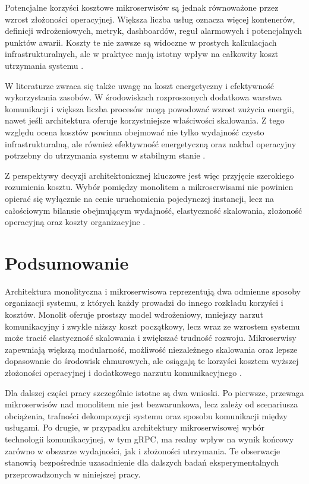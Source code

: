 Potencjalne korzyści kosztowe mikroserwisów są jednak równoważone przez wzrost złożoności operacyjnej. Większa liczba usług oznacza więcej kontenerów, definicji wdrożeniowych, metryk, dashboardów, reguł alarmowych i potencjalnych punktów awarii. Koszty te nie zawsze są widoczne w prostych kalkulacjach infrastrukturalnych, ale w praktyce mają istotny wpływ na całkowity koszt utrzymania systemu \cite{papakonstantinou2020technoeconomic}.

W literaturze zwraca się także uwagę na koszt energetyczny i efektywność wykorzystania zasobów. W środowiskach rozproszonych dodatkowa warstwa komunikacji i większa liczba procesów mogą powodować wzrost zużycia energii, nawet jeśli architektura oferuje korzystniejsze właściwości skalowania. Z tego względu ocena kosztów powinna obejmować nie tylko wydajność czysto infrastrukturalną, ale również efektywność energetyczną oraz nakład operacyjny potrzebny do utrzymania systemu w stabilnym stanie \cite{fontanadenardin2021energy}.

Z perspektywy decyzji architektonicznej kluczowe jest więc przyjęcie szerokiego rozumienia kosztu. Wybór pomiędzy monolitem a mikroserwisami nie powinien opierać się wyłącznie na cenie uruchomienia pojedynczej instancji, lecz na całościowym bilansie obejmującym wydajność, elastyczność skalowania, złożoność operacyjną oraz koszty organizacyjne \cite{villamizar2017cost}.

\section{Podsumowanie}
\label{sec:chapter2-summary}

Architektura monolityczna i mikroserwisowa reprezentują dwa odmienne sposoby organizacji systemu, z których każdy prowadzi do innego rozkładu korzyści i kosztów. Monolit oferuje prostszy model wdrożeniowy, mniejszy narzut komunikacyjny i zwykle niższy koszt początkowy, lecz wraz ze wzrostem systemu może tracić elastyczność skalowania i zwiększać trudność rozwoju. Mikroserwisy zapewniają większą modularność, możliwość niezależnego skalowania oraz lepsze dopasowanie do środowisk chmurowych, ale osiągają te korzyści kosztem wyższej złożoności operacyjnej i dodatkowego narzutu komunikacyjnego \cite{jaskot2022}.

Dla dalszej części pracy szczególnie istotne są dwa wnioski. Po pierwsze, przewaga mikroserwisów nad monolitem nie jest bezwarunkowa, lecz zależy od scenariusza obciążenia, trafności dekompozycji systemu oraz sposobu komunikacji między usługami. Po drugie, w przypadku architektury mikroserwisowej wybór technologii komunikacyjnej, w tym gRPC, ma realny wpływ na wynik końcowy zarówno w obszarze wydajności, jak i złożoności utrzymania. Te obserwacje stanowią bezpośrednie uzasadnienie dla dalszych badań eksperymentalnych przeprowadzonych w niniejszej pracy.